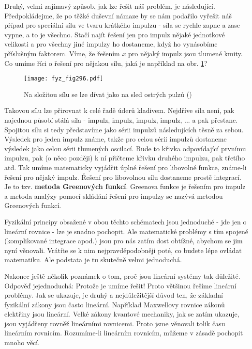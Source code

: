 {    Druhý, velmi zajímavý způsob, jak lze řešit náš problém, je následující. Předpokládejme, že po 
    těžké duševní námaze by se nám podařilo vyřešit náš případ pro speciální sílu ve tvaru krátkého 
    impulzu - síla se rychle zapne a zase vypne, a to je všechno. Stačí najít řešení jen pro impulz 
    nějaké jednotkové velikosti a pro všechny jiné impulzy ho dostaneme, když ho vynásobíme 
    příslušným faktorem. Víme, že řešením \(x\) pro nějaký impulz jsou tlumené kmity. Co umíme říci 
    o řešení pro nějakou sílu, jaká je například na obr. \ref{fyz:fig296}?

    \begin{figure}[ht!] %
      \centering
      \texttt{[image: fyz\_fig296.pdf]}
      \caption{Na složitou sílu se lze dívat jako na sled ostrých pulzů
               (\cite[s.~337]{Feynman01})}
      \label{fyz:fig296}
    \end{figure}
    
    Takovou sílu lze přirovnat k celé řadě úderů kladivem. Nejdříve síla není, pak najednou působí 
    stálá síla - impulz, impulz, impulz, impulz, ... a pak přestane. Spojitou sílu si tedy 
    představíme jako sérii impulzů následujících těsně za sebou. Výsledek pro jeden impulz známe, 
    takže pro celou sérii impulzů dostaneme výsledek jako celou sérii tlumených oscilací. Bude to 
    křivka odpovídající prvnímu impulzu, pak (o něco později) k ní přičteme křivku druhého impulzu, 
    pak třetího atd. Tak umíme matematicky vyjádřit úplné řešení pro libovolné funkce, známe-li 
    řešení pro nějaký impulz. Řešení pro libovolnou sílu dostaneme prostě integrací. Je to tzv. 
    \textbf{metoda Greenových funkcí}. Greenova funkce je řešením pro impulz a metoda analýzy 
    pomocí skládání řešení pro impulzy se nazývá metodou Greenových funkcí.
    
    Fyzikální principy obsažené v obou těchto schématech jsou jednoduché - jde jen o lineární 
    rovnice - lze je snadno pochopit. Ale matematické problémy s tím spojené (komplikované 
    integrace apod.) jsou pro nás zatím dost obtížné, abychom se jim nyní věnovali. Vrátíte se k 
    nim nejpravděpodobněji poté, co budete lépe ovládat matematiku. Ale podstata je tu skutečně 
    velmi jednoduchá.
    
    Nakonec ještě několik poznámek o tom, proč jsou lineární systémy tak důležité. Odpověď 
    jejednoduchá: Protože je umíme řešit! Proto většinou řešíme lineární problémy. Jak se ukazuje, 
    je druhý a nejdůležitější důvod ten, že základní fyzikální zákony jsou často lineární. 
    Například Maxwellovy rovnice zákonů elektřiny jsou lineární. Velké zákony kvantové mechaniky, 
    jak se zatím ukazuje, jsou vyjádřeny rovněž lineárními rovnicemi. Proto jsme věnovali tolik 
    času lineárním rovnicím. Rozumíme-li lineárním rovnicím, můžeme v zásadě pochopit mnoho věcí.
    
}
